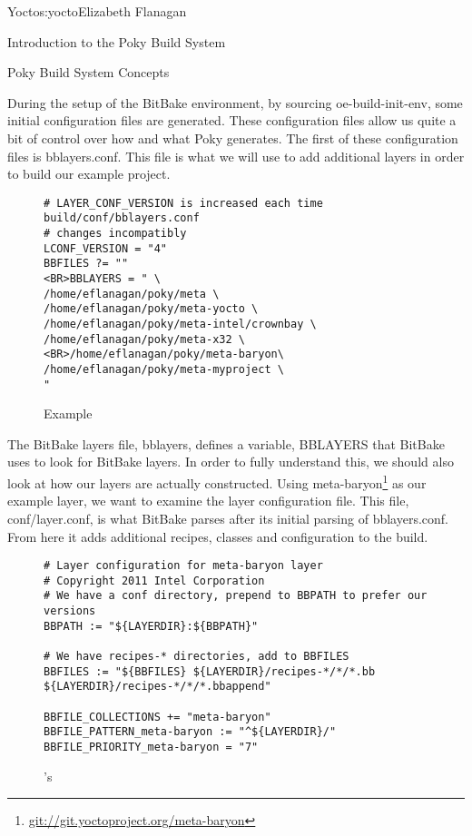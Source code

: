 \begin{aosachapter}{Yocto}{s:yocto}{Elizabeth Flanagan}
\begin{aosasect1}{Introduction to the Poky Build System}
\begin{aosasect2}{Poky Build System Concepts}

During the setup of the BitBake environment, by sourcing
oe-build-init-env, some initial configuration files are generated.
These configuration files allow us quite a bit of control over how and
what Poky generates. The first of these configuration files is
bblayers.conf. This file is what we will use to add additional layers
in order to build our example project.

\begin{figure}
\begin{verbatim}
# LAYER_CONF_VERSION is increased each time build/conf/bblayers.conf
# changes incompatibly
LCONF_VERSION = "4"
BBFILES ?= ""
<BR>BBLAYERS = " \
/home/eflanagan/poky/meta \
/home/eflanagan/poky/meta-yocto \
/home/eflanagan/poky/meta-intel/crownbay \
/home/eflanagan/poky/meta-x32 \<BR>/home/eflanagan/poky/meta-baryon\
/home/eflanagan/poky/meta-myproject \
"
\end{verbatim}
\caption{Example }
\label{fig.yocto.bblayers}
\end{figure}

The BitBake layers file, bblayers, defines a variable, BBLAYERS that
BitBake uses to look for BitBake layers. In order to fully understand
this, we should also look at how our layers are actually
constructed. Using
meta-baryon\footnote{\url{git://git.yoctoproject.org/meta-baryon}} as
our example layer, we want to examine the layer configuration
file. This file, conf/layer.conf, is what BitBake parses after its
initial parsing of bblayers.conf. From here it adds additional
recipes, classes and configuration to the build.

\begin{figure}
\begin{verbatim}
# Layer configuration for meta-baryon layer
# Copyright 2011 Intel Corporation
# We have a conf directory, prepend to BBPATH to prefer our versions
BBPATH := "${LAYERDIR}:${BBPATH}"

# We have recipes-* directories, add to BBFILES
BBFILES := "${BBFILES} ${LAYERDIR}/recipes-*/*/*.bb ${LAYERDIR}/recipes-*/*/*.bbappend"

BBFILE_COLLECTIONS += "meta-baryon"
BBFILE_PATTERN_meta-baryon := "^${LAYERDIR}/"
BBFILE_PRIORITY_meta-baryon = "7"
\end{verbatim}
\caption{\code{meta-baryon}'s \code{layer.conf}}
\label{fig.yocto.metabaryon}
\end{figure}


\end{aosasect2}
\end{aosasect1}
\end{aosachapter}
